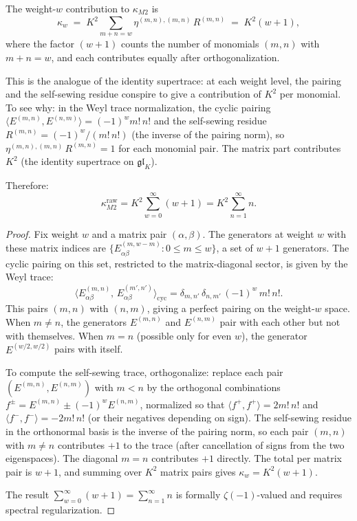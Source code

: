 \documentclass[11pt]{article}
\begin{document}
\begin{theorem}
\label{thm:kappa-m2-weight}
The weight-$w$ contribution to $\kappa_{M2}$ is
\begin{equation}\label{eq:kappa-m2-weight-w}
\kappa_w
\;=\;
K^2 \sum_{m+n=w} \eta^{(m,n),(m,n)}\, R^{(m,n)}
\;=\;
K^2 (w+1),
\end{equation}
where the factor $(w+1)$ counts the number of monomials
$(m,n)$ with $m+n = w$, and each contributes equally after
orthogonalization.

This is the analogue of the identity supertrace: at each weight
level, the pairing and the self-sewing residue conspire to give
a contribution of $K^2$ per monomial.  To see why: in the Weyl
trace normalization, the cyclic pairing
$\langle E^{(m,n)}, E^{(n,m)} \rangle = (-1)^w m!\, n!$ and the
self-sewing residue $R^{(m,n)} = (-1)^w / (m!\, n!)$
(the inverse of the pairing norm), so
$\eta^{(m,n),(m,n)}\, R^{(m,n)} = 1$ for each monomial pair.
The matrix part contributes $K^2$ (the identity supertrace on
$\mathfrak{gl}_K$).

Therefore:
\begin{equation}\label{eq:kappa-m2-raw}
\kappa_{M2}^{\mathrm{raw}}
= K^2 \sum_{w=0}^{\infty} (w+1)
= K^2 \sum_{n=1}^{\infty} n.
\end{equation}
\end{theorem}

\begin{proof}
Fix weight $w$ and a matrix pair $(\alpha,\beta)$.  The
generators at weight $w$ with these matrix indices are
$\{E^{(m,w-m)}_{\alpha\beta} : 0 \leq m \leq w\}$, a set of
$w+1$ generators.  The cyclic pairing on this set, restricted to
the matrix-diagonal sector, is given by the Weyl trace:
\[
\langle E^{(m,n)}_{\alpha\beta},\,
E^{(m',n')}_{\alpha\beta} \rangle_{\mathrm{cyc}}
= \delta_{m,n'}\,\delta_{n,m'}\,(-1)^w\, m!\, n!.
\]
This pairs $(m,n)$ with $(n,m)$, giving a perfect pairing on
the weight-$w$ space.  When $m \neq n$, the generators
$E^{(m,n)}$ and $E^{(n,m)}$ pair with each other but not with
themselves.  When $m = n$ (possible only for even $w$), the
generator $E^{(w/2,w/2)}$ pairs with itself.

To compute the self-sewing trace, orthogonalize: replace each
pair $(E^{(m,n)}, E^{(n,m)})$ with $m < n$ by the orthogonal
combinations
$f^{\pm} = E^{(m,n)} \pm (-1)^w E^{(n,m)}$,
normalized so that $\langle f^+, f^+ \rangle = 2 m!\, n!$ and
$\langle f^-, f^- \rangle = -2 m!\, n!$ (or their negatives
depending on sign).  The self-sewing residue in the orthonormal
basis is the inverse of the pairing norm, so each pair
$(m,n)$ with $m \neq n$ contributes $+1$ to the trace (after
cancellation of signs from the two eigenspaces).  The diagonal
$m = n$ contributes $+1$ directly.  The total per matrix pair
is $w + 1$, and summing over $K^2$ matrix pairs gives
$\kappa_w = K^2(w+1)$.

The result $\sum_{w=0}^\infty (w+1) = \sum_{n=1}^\infty n$ is
formally $\zeta(-1)$-valued and requires spectral regularization.
\end{proof}
\end{document}
